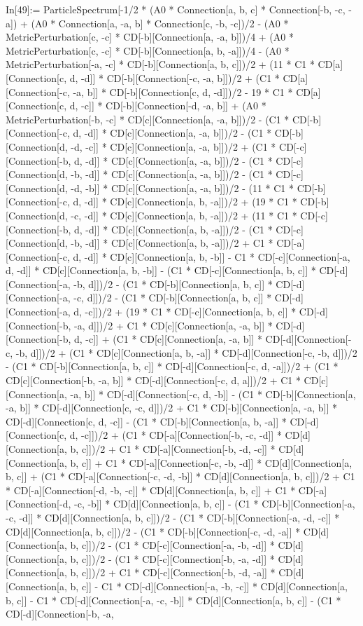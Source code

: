 In[49]:= ParticleSpectrum[-1/2 * (A0 * Connection[a, b, c] * Connection[-b, -c, -a]) + (A0 * Connection[a, -a, b] * Connection[c, -b, -c])/2 - (A0 * MetricPerturbation[c, -c] * CD[-b][Connection[a, -a, b]])/4 + (A0 * MetricPerturbation[c, -c] * CD[-b][Connection[a, b, -a]])/4 - (A0 * MetricPerturbation[-a, -c] * CD[-b][Connection[a, b, c]])/2 + (11 * C1 * CD[a][Connection[c, d, -d]] * CD[-b][Connection[-c, -a, b]])/2 + (C1 * CD[a][Connection[-c, -a, b]] * CD[-b][Connection[c, d, -d]])/2 - 19 * C1 * CD[a][Connection[c, d, -c]] * CD[-b][Connection[-d, -a, b]] + (A0 * MetricPerturbation[-b, -c] * CD[c][Connection[a, -a, b]])/2 - (C1 * CD[-b][Connection[-c, d, -d]] * CD[c][Connection[a, -a, b]])/2 - (C1 * CD[-b][Connection[d, -d, -c]] * CD[c][Connection[a, -a, b]])/2 + (C1 * CD[-c][Connection[-b, d, -d]] * CD[c][Connection[a, -a, b]])/2 - (C1 * CD[-c][Connection[d, -b, -d]] * CD[c][Connection[a, -a, b]])/2 - (C1 * CD[-c][Connection[d, -d, -b]] * CD[c][Connection[a, -a, b]])/2 - (11 * C1 * CD[-b][Connection[-c, d, -d]] * CD[c][Connection[a, b, -a]])/2 + (19 * C1 * CD[-b][Connection[d, -c, -d]] * CD[c][Connection[a, b, -a]])/2 + (11 * C1 * CD[-c][Connection[-b, d, -d]] * CD[c][Connection[a, b, -a]])/2 - (C1 * CD[-c][Connection[d, -b, -d]] * CD[c][Connection[a, b, -a]])/2 + C1 * CD[-a][Connection[-c, d, -d]] * CD[c][Connection[a, b, -b]] - C1 * CD[-c][Connection[-a, d, -d]] * CD[c][Connection[a, b, -b]] - (C1 * CD[-c][Connection[a, b, c]] * CD[-d][Connection[-a, -b, d]])/2 - (C1 * CD[-b][Connection[a, b, c]] * CD[-d][Connection[-a, -c, d]])/2 - (C1 * CD[-b][Connection[a, b, c]] * CD[-d][Connection[-a, d, -c]])/2 + (19 * C1 * CD[-c][Connection[a, b, c]] * CD[-d][Connection[-b, -a, d]])/2 + C1 * CD[c][Connection[a, -a, b]] * CD[-d][Connection[-b, d, -c]] + (C1 * CD[c][Connection[a, -a, b]] * CD[-d][Connection[-c, -b, d]])/2 + (C1 * CD[c][Connection[a, b, -a]] * CD[-d][Connection[-c, -b, d]])/2 - (C1 * CD[-b][Connection[a, b, c]] * CD[-d][Connection[-c, d, -a]])/2 + (C1 * CD[c][Connection[-b, -a, b]] * CD[-d][Connection[-c, d, a]])/2 + C1 * CD[c][Connection[a, -a, b]] * CD[-d][Connection[-c, d, -b]] - (C1 * CD[-b][Connection[a, -a, b]] * CD[-d][Connection[c, -c, d]])/2 + C1 * CD[-b][Connection[a, -a, b]] * CD[-d][Connection[c, d, -c]] - (C1 * CD[-b][Connection[a, b, -a]] * CD[-d][Connection[c, d, -c]])/2 + (C1 * CD[-a][Connection[-b, -c, -d]] * CD[d][Connection[a, b, c]])/2 + C1 * CD[-a][Connection[-b, -d, -c]] * CD[d][Connection[a, b, c]] + C1 * CD[-a][Connection[-c, -b, -d]] * CD[d][Connection[a, b, c]] + (C1 * CD[-a][Connection[-c, -d, -b]] * CD[d][Connection[a, b, c]])/2 + C1 * CD[-a][Connection[-d, -b, -c]] * CD[d][Connection[a, b, c]] + C1 * CD[-a][Connection[-d, -c, -b]] * CD[d][Connection[a, b, c]] - (C1 * CD[-b][Connection[-a, -c, -d]] * CD[d][Connection[a, b, c]])/2 - (C1 * CD[-b][Connection[-a, -d, -c]] * CD[d][Connection[a, b, c]])/2 - (C1 * CD[-b][Connection[-c, -d, -a]] * CD[d][Connection[a, b, c]])/2 - (C1 * CD[-c][Connection[-a, -b, -d]] * CD[d][Connection[a, b, c]])/2 - (C1 * CD[-c][Connection[-b, -a, -d]] * CD[d][Connection[a, b, c]])/2 + C1 * CD[-c][Connection[-b, -d, -a]] * CD[d][Connection[a, b, c]] - C1 * CD[-d][Connection[-a, -b, -c]] * CD[d][Connection[a, b, c]] - C1 * CD[-d][Connection[-a, -c, -b]] * CD[d][Connection[a, b, c]] - (C1 * CD[-d][Connection[-b, -a, 